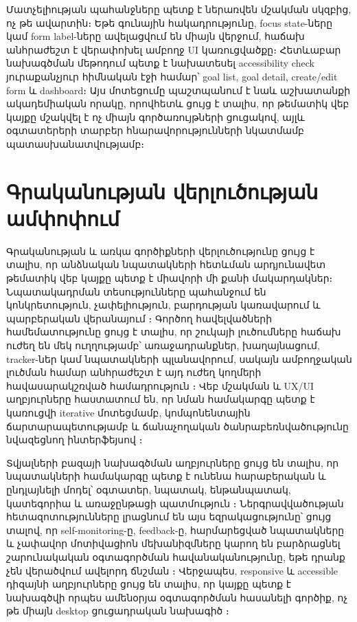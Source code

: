 Մատչելիության պահանջները պետք է ներառվեն մշակման սկզբից, ոչ թե ավարտին։ Եթե գունային հակադրությունը, focus state-ները կամ form label-ները ավելացվում են միայն վերջում, հաճախ անհրաժեշտ է վերափոխել ամբողջ UI կառուցվածքը։ Հետևաբար նախագծման մեթոդում պետք է նախատեսել accessibility check յուրաքանչյուր հիմնական էջի համար՝ goal list, goal detail, create/edit form և dashboard։ Այս մոտեցումը պաշտպանում է նաև աշխատանքի ակադեմիական որակը, որովհետև ցույց է տալիս, որ թեմատիկ վեբ կայքը մշակվել է ոչ միայն գործառույթների ցուցակով, այլև օգտատերերի տարբեր հնարավորությունների նկատմամբ պատասխանատվությամբ։

\section{Գրականության վերլուծության ամփոփում}

Գրականության և առկա գործիքների վերլուծությունը ցույց է տալիս, որ անձնական նպատակների հետևման արդյունավետ թեմատիկ վեբ կայքը պետք է միավորի մի քանի մակարդակներ։ Նպատակադրման տեսությունները պահանջում են կոնկրետություն, չափելիություն, բարդության կառավարում և պարբերական վերանայում \autocite{doran1981smart,locke2002building,doerr2018measure}։ Գործող հավելվածների համեմատությունը ցույց է տալիս, որ շուկայի լուծումները հաճախ ուժեղ են մեկ ուղղությամբ՝ առաջադրանքներ, խաղայնացում, tracker-ներ կամ նպատակների պլանավորում, սակայն ամբողջական լուծման համար անհրաժեշտ է այդ ուժեղ կողմերի հավասարակշռված համադրություն \autocite{todoistFeatures,habiticaAppStore,stridesOfficial,goalsOnTrackFeatures}։ Վեբ մշակման և UX/UI աղբյուրները հաստատում են, որ նման համակարգը պետք է կառուցվի iterative մոտեցմամբ, կոմպոնենտային ճարտարապետությամբ և ճանաչողական ծանրաբեռնվածությունը նվազեցնող ինտերֆեյսով \autocite{beck2001agile,norman2013design,reactDocsState,nextDocsRendering}։

Տվյալների բազայի նախագծման աղբյուրները ցույց են տալիս, որ նպատակների համակարգը պետք է ունենա հարաբերական և ընդլայնելի մոդել՝ օգտատեր, նպատակ, ենթանպատակ, կատեգորիա և առաջընթացի պատմություն \autocite{date2004introduction,postgresDocsConstraints,prismaDocsRelations}։ Ներգրավվածության հետազոտությունները լրացնում են այս եզրակացությունը՝ ցույց տալով, որ self-monitoring-ը, feedback-ը, հարմարեցված նպատակները և չափավոր մոտիվացիոն մեխանիզմները կարող են բարձրացնել շարունակական օգտագործման հավանականությունը, եթե դրանք չեն վերածվում ավելորդ ճնշման \autocite{bctEngagement2023,walkingGoals2024,wang2022gamification}։ Վերջապես, responsive և accessible դիզայնի աղբյուրները ցույց են տալիս, որ կայքը պետք է նախագծվի որպես ամենօրյա օգտագործման հասանելի գործիք, ոչ թե միայն desktop ցուցադրական նախագիծ \autocite{w3cWcag22,datareportal2026}։

